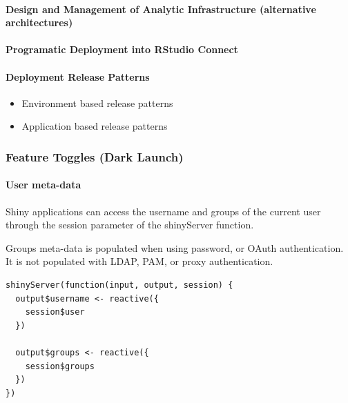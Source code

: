 \documentclass[]{book}
\providecommand{\tightlist}{%
  \setlength{\itemsep}{0pt}\setlength{\parskip}{0pt}}
\let\oldparagraph\paragraph
\renewcommand{\paragraph}[1]{\oldparagraph{#1}\mbox{}}
\theoremstyle{definition}
\theoremstyle{definition}
\theoremstyle{definition}
\theoremstyle{remark}
\begin{document}
\hypertarget{design-and-management-of-analytic-infrastructure-alternative-architectures}{%
\paragraph{Design and Management of Analytic Infrastructure (alternative
architectures)}\label{design-and-management-of-analytic-infrastructure-alternative-architectures}}

\hypertarget{programatic-deployment-into-rstudio-connect}{%
\paragraph{Programatic Deployment into RStudio
Connect}\label{programatic-deployment-into-rstudio-connect}}

\hypertarget{deployment-release-patterns}{%
\paragraph{Deployment Release
Patterns}\label{deployment-release-patterns}}

\begin{itemize}
\tightlist
\item
  Environment based release patterns
\item
  Application based release patterns
\end{itemize}

\hypertarget{feature-toggles-dark-launch}{%
\subsubsection{Feature Toggles (Dark
Launch)}\label{feature-toggles-dark-launch}}

\hypertarget{user-meta-data}{%
\paragraph{User meta-data}\label{user-meta-data}}

Shiny applications can access the username and groups of the current
user through the session parameter of the shinyServer function.

Groups meta-data is populated when using password, or OAuth
authentication. It is not populated with LDAP, PAM, or proxy
authentication.

\begin{verbatim}
shinyServer(function(input, output, session) {
  output$username <- reactive({
    session$user
  })
  
  output$groups <- reactive({
    session$groups
  })
})
\end{verbatim}
\end{document}
